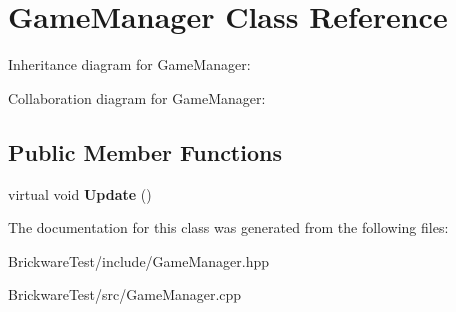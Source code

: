 \hypertarget{classGameManager}{}\section{Game\+Manager Class Reference}
\label{classGameManager}


Inheritance diagram for Game\+Manager\+:


Collaboration diagram for Game\+Manager\+:
\subsection*{Public Member Functions}
\begin{DoxyCompactItemize}
\item 
\hypertarget{classGameManager_af3bb4452ac262ec8a68dcc3eea2f0124}{}virtual void {\bfseries Update} ()\label{classGameManager_af3bb4452ac262ec8a68dcc3eea2f0124}

\end{DoxyCompactItemize}


The documentation for this class was generated from the following files\+:\begin{DoxyCompactItemize}
\item 
Brickware\+Test/include/Game\+Manager.\+hpp\item 
Brickware\+Test/src/Game\+Manager.\+cpp\end{DoxyCompactItemize}
